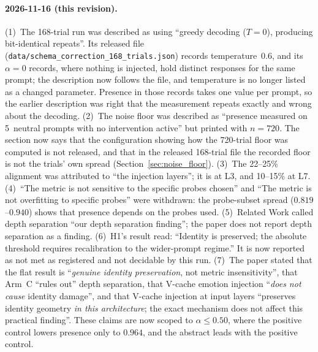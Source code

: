 \documentclass[11pt,a4paper]{article}
\begin{document}
\paragraph{2026-11-16 (this revision).} (1)~The 168-trial run was
described as using ``greedy decoding ($T{=}0$), producing bit-identical
repeats''. Its released file (\nolinkurl{data/schema_correction_168_trials.json})
records temperature~0.6, and its $\alpha = 0$ records, where nothing is
injected, hold distinct responses for the same prompt; the description
now follows the file, and temperature is no longer listed as a changed
parameter. Presence in those records takes one value per prompt, so the
earlier description was right that the measurement repeats exactly and
wrong about the decoding. (2)~The noise floor was described as ``presence measured on
5~neutral prompts with no intervention active'' but printed with
$n = 720$. The section now says that the configuration showing how the
720-trial floor was computed is not released, and that in the released
168-trial file the recorded floor is not the trials' own spread
(Section~\ref{sec:noise_floor}). (3)~The 22--25\% alignment was
attributed to ``the injection layers''; it is at L3, and 10--15\% at L7.
(4)~``The metric is not sensitive to the specific probes chosen'' and
``The metric is not overfitting to specific probes'' were withdrawn: the
probe-subset spread ($0.819$--$0.940$) shows that presence depends on the
probes used. (5)~Related Work called depth separation ``our depth
separation finding''; the paper does not report depth separation as a
finding. (6)~H1's result read: ``Identity is preserved; the absolute
threshold requires recalibration to the wider-prompt regime.'' It is now
reported as not met as registered and not decidable by this run.
(7)~The paper stated that the flat result is ``\emph{genuine identity
preservation}, not metric insensitivity'', that Arm~C ``rules out''
depth separation, that V-cache emotion injection ``\emph{does not cause}
identity damage'', and that V-cache injection at input layers
``preserves identity geometry \emph{in this architecture}; the exact
mechanism does not affect this practical finding''. These claims are now
scoped to $\alpha \le 0.50$, where the positive control lowers presence
only to $0.964$, and the abstract leads with the positive control.



\end{document}
